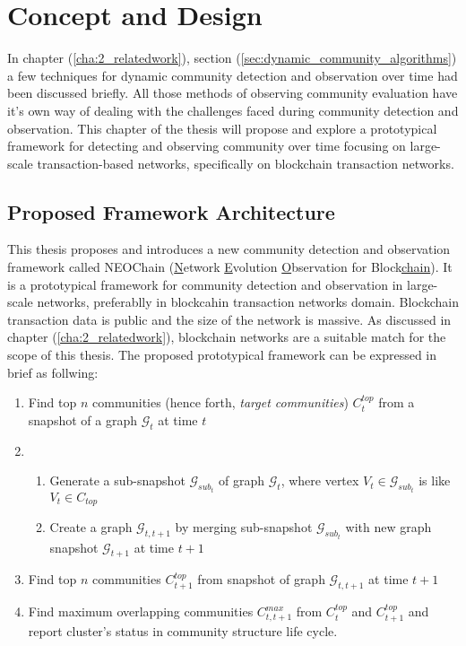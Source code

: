\chapter{Concept and Design}\label{cha:3_concept_and_design}
In chapter (\ref{cha:2_relatedwork}), section (\ref{sec:dynamic_community_algorithms}) a few techniques for dynamic community detection and observation over time had been discussed briefly. All those methods of observing community evaluation have it's own way of dealing with the challenges faced during community detection and observation. This chapter of the thesis will propose and explore a prototypical framework for detecting and observing community over time focusing on large-scale transaction-based networks, specifically on blockchain transaction networks.

\section{Proposed Framework Architecture}\label{sec:framework}
This thesis proposes and introduces a new community detection and observation framework called NEOChain (\underline{N}etwork \underline{E}volution \underline{O}bservation for Block\underline{chain}). It is a prototypical framework for community detection and observation in large-scale networks, preferablly in blockcahin transaction networks domain. Blockchain transaction data is public and the size of the network is massive. As discussed in chapter (\ref{cha:2_relatedwork}), blockchain networks are a suitable match for the scope of this thesis. The proposed prototypical framework can be expressed in brief as follwing:

\begin{enumerate}[label=(\roman*)]
\item Find top $n$ communities (hence forth, \textit{target communities}) $C_t^{top}$ from a snapshot of a graph $\mathcal{G}_t$ at time $t$
\item
\begin{enumerate}
	\item Generate a sub-snapshot $\mathcal{G}_{sub_{t}}$ of graph $\mathcal{G}_t$, where vertex $V_t 		\in \mathcal{G}_{sub_{t}}$ is like $V_t \in C_{top}$ 
	\item Create a graph $\mathcal{G}_{t, t+1}$ by merging sub-snapshot $\mathcal{G}_{sub_{t}}$ with 		new graph snapshot $\mathcal{G}_{t+1}$ at time $t+1$
\end{enumerate}
\item Find top $n$ communities $C_{t+1}^{top}$ from snapshot of graph $\mathcal{G}_{t, t+1}$ at time $t+1$
\item Find maximum overlapping communities $C_{t, t+1}^{max}$ from $C_t^{top}$ and $C_{t+1}^{top}$ and report cluster's status in community structure life cycle.
\end{enumerate}

